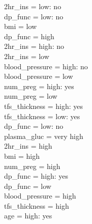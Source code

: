\documentclass[12pt]{article}
\begin{document}
\textbar\quad \textbar\quad \textbar\quad \textbar\quad \textbar\quad \textbar\quad 2hr\_ins = low: no\\
\textbar\quad \textbar\quad \textbar\quad \textbar\quad dp\_func = low: no\\
\textbar\quad \textbar\quad bmi = low\\
\textbar\quad \textbar\quad \textbar\quad dp\_func = high\\
\textbar\quad \textbar\quad \textbar\quad \textbar\quad 2hr\_ins = high: no\\
\textbar\quad \textbar\quad \textbar\quad \textbar\quad 2hr\_ins = low\\
\textbar\quad \textbar\quad \textbar\quad \textbar\quad \textbar\quad blood\_pressure = high: no\\
\textbar\quad \textbar\quad \textbar\quad \textbar\quad \textbar\quad blood\_pressure = low\\
\textbar\quad \textbar\quad \textbar\quad \textbar\quad \textbar\quad \textbar\quad num\_preg = high: yes\\
\textbar\quad \textbar\quad \textbar\quad \textbar\quad \textbar\quad \textbar\quad num\_preg = low\\
\textbar\quad \textbar\quad \textbar\quad \textbar\quad \textbar\quad \textbar\quad \textbar\quad tfs\_thickness = high: yes\\
\textbar\quad \textbar\quad \textbar\quad \textbar\quad \textbar\quad \textbar\quad \textbar\quad tfs\_thickness = low: yes\\
\textbar\quad \textbar\quad \textbar\quad dp\_func = low: no\\
plasma\_gluc = very high\\
\textbar\quad 2hr\_ins = high\\
\textbar\quad \textbar\quad bmi = high\\
\textbar\quad \textbar\quad \textbar\quad num\_preg = high\\
\textbar\quad \textbar\quad \textbar\quad \textbar\quad dp\_func = high: yes\\
\textbar\quad \textbar\quad \textbar\quad \textbar\quad dp\_func = low\\
\textbar\quad \textbar\quad \textbar\quad \textbar\quad \textbar\quad blood\_pressure = high\\
\textbar\quad \textbar\quad \textbar\quad \textbar\quad \textbar\quad \textbar\quad tfs\_thickness = high\\
\textbar\quad \textbar\quad \textbar\quad \textbar\quad \textbar\quad \textbar\quad \textbar\quad age = high: yes\\
\end{document}
